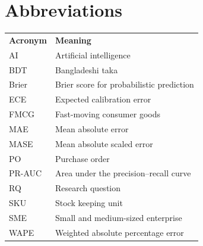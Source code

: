 \pagestyle{fancy}

\clearpage

\begin{abstract}

\end{abstract}
\clearpage

\clearpage

\pagestyle{fancy}
\tableofcontents

\listoffigures

\listoftables

\listofalgorithms

\chapter*{Abbreviations}
\begin{longtable}{p{}p{}}
\textbf{Acronym} & \textbf{Meaning}\\
AI & Artificial intelligence\\
BDT & Bangladeshi taka\\
Brier & Brier score for probabilistic prediction\\
ECE & Expected calibration error\\
FMCG & Fast-moving consumer goods\\
MAE & Mean absolute error\\
MASE & Mean absolute scaled error\\
PO & Purchase order\\
PR-AUC & Area under the precision--recall curve\\
RQ & Research question\\
SKU & Stock keeping unit\\
SME & Small and medium-sized enterprise\\
WAPE & Weighted absolute percentage error\\
\end{longtable}
\clearpage
